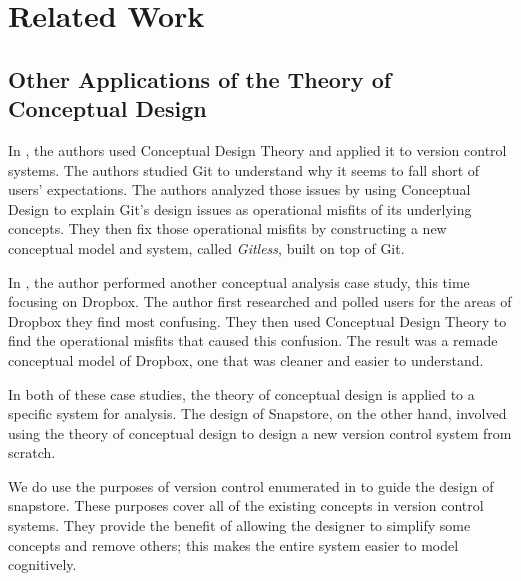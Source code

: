 \chapter{Related Work}

\section{Other Applications of the Theory of Conceptual Design}



In \cite{RossoJackson}, the authors used Conceptual Design Theory and applied it to version control systems. The authors studied Git to understand why it seems to fall short of users' expectations. The authors analyzed those issues by using Conceptual Design to explain Git's design issues as operational misfits of its underlying concepts. They then fix those operational misfits by constructing a new conceptual model and system, called \textit{Gitless}, built on top of Git.

In \cite{Zhang}, the author performed another conceptual analysis case study, this time focusing on Dropbox. The author first researched and polled users for the areas of Dropbox they find most confusing. They then used Conceptual Design Theory to find the operational misfits that caused this confusion. The result was a remade conceptual model of Dropbox, one that was cleaner and easier to understand.

In both of these case studies, the theory of conceptual design is applied to a specific system for analysis. The design of Snapstore, on the other hand, involved using the theory of conceptual design to design a new version control system from scratch.

We do use the purposes of version control enumerated in \cite{RossoJackson} to guide the design of snapstore. These purposes cover all of the existing concepts in version control systems. They provide the benefit of allowing the designer to simplify some concepts and remove others; this makes the entire system easier to model cognitively. 

